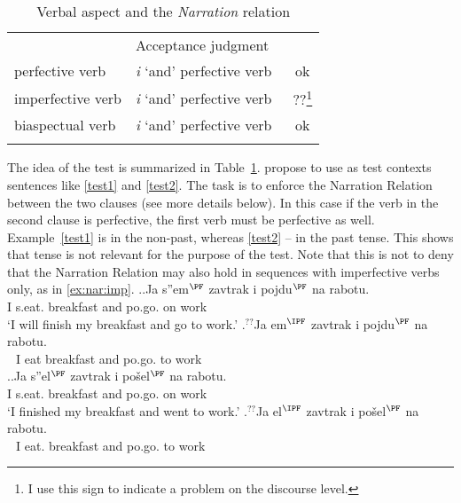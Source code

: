 \begin{table}
\caption{\label{table}Verbal aspect and the \textit{Narration} relation}
\begin{tabular}{llc}
\lsptoprule
\multicolumn{2}{c}{Verbal combination}& Acceptance judgment\\\cmidrule(r){1-2}\cmidrule(l){3-3}
perfective verb & \textit{i} `and' perfective verb~ & ok\\
imperfective verb & \textit{i} `and' perfective verb~ & ??\footnote{I use this sign to indicate a problem on the discourse level.}\\
biaspectual verb & \textit{i} `and' perfective verb~ & ok\\
\lspbottomrule
\end{tabular}
\end{table}

The idea of the test is summarized in Table~\ref{table}. \citet{ZinovaFilip:13} propose to use as test contexts sentences like \ref{test1} and \ref{test2}. The task is to enforce the Narration Relation  between the two clauses (see more details below). In this case if the verb in the second clause is perfective, the first verb must be perfective as well. Example~\ref{test1} is in the non-past, whereas \ref{test2} -- in the past tense. This shows that tense is not relevant for the purpose of the test. Note that this is not to deny that the Narration Relation may also hold in sequences with imperfective verbs only, as in \ref{ex:nar:imp}.
\ex.\label{test1}\ag.\label{test11}Ja s''em$^{\PF}$ zavtrak i pojdu$^{\PF}$ na rabotu.\\
I s.eat. breakfast and po.go. on work\\
\vspace{0.5em}
`I will finish my breakfast and go to work.'
\bg.\label{test12}$^{??}$Ja em$^{\IPF}$ zavtrak i pojdu$^{\PF}$ na rabotu.\\ 
\textcolor{white}{$^{??}$}I eat breakfast and po.go. to work\\

\ex.\label{test2}\ag.\label{test21}Ja s''el$^{\PF}$ zavtrak i po\v{s}el$^{\PF}$ na rabotu.\\
I s.eat. breakfast and po.go. on work\\
\vspace{0.5em}
`I finished my breakfast and went to work.'
\bg.\label{test22}$^{??}$Ja el$^{\IPF}$ zavtrak i po\v{s}el$^{\PF}$ na rabotu.\\
\textcolor{white}{$^{??}$}I eat. breakfast and po.go. to work\\

